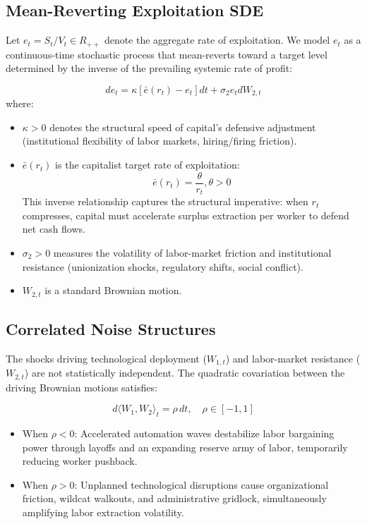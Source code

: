 \documentclass[11pt,letterpaper]{report}
\begin{document}
\subsection{Mean-Reverting Exploitation SDE}
Let ${e}_{t}={S}_{t}/{V}_{t}\in {R}_{++}$ denote the aggregate rate of exploitation. We model ${e}_{t}$ as a continuous-time stochastic process that mean-reverts toward a target level determined by the inverse of the prevailing systemic rate of profit:

\[
d{e}_{t}=\kappa \left[{\bar{e}({r}_{t})-{e}_{t}}\right]dt+{\sigma }_{2}{e}_{t}d{W}_{2,t}
\]
where:

\begin{itemize}
\item $\kappa >0$ denotes the structural speed of capital's defensive adjustment (institutional flexibility of labor markets, hiring/firing friction).
\item $\bar{e}({r}_{t})$ is the capitalist target rate of exploitation:
\[
\bar{e}({r}_{t})=\frac{\theta }{{r}_{t}},\theta >0
\]
This inverse relationship captures the structural imperative: when ${r}_{t}$ compresses, capital must accelerate surplus extraction per worker to defend net cash flows.
\item ${\sigma }_{2}>0$ measures the volatility of labor-market friction and institutional resistance (unionization shocks, regulatory shifts, social conflict).
\item ${W}_{2,t}$ is a standard Brownian motion.
\end{itemize}
\subsection{Correlated Noise Structures}
The shocks driving technological deployment (${W}_{1,t}$) and labor-market resistance (${W}_{2,t}$) are not statistically independent. The quadratic covariation between the driving Brownian motions satisfies:

\[
d\langle W_1, W_2 \rangle_t = \rho \, dt, \quad \rho \in [-1, 1]
\]
\begin{itemize}
\item When $\rho <0$: Accelerated automation waves destabilize labor bargaining power through layoffs and an expanding reserve army of labor, temporarily reducing worker pushback.
\item When $\rho >0$: Unplanned technological disruptions cause organizational friction, wildcat walkouts, and administrative gridlock, simultaneously amplifying labor extraction volatility.
\end{itemize}
\end{document}
